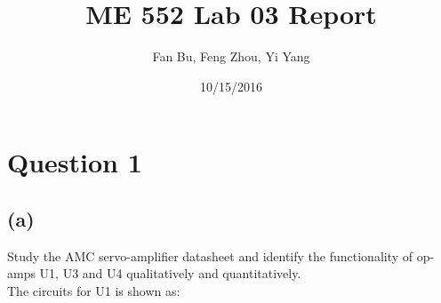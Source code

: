 \documentclass[letterpaper]{article}
\author{Fan Bu, Feng Zhou, Yi Yang}
\title{ME 552 Lab 03 Report}
\begin{document}
\date{10/15/2016}
\maketitle

\newcommand{\trace}{\mathrm{trace}}
\newcommand{\real}{\mathbb R}  %
\newcommand{\nat}{\mathbb N}   %
\newcommand{\cp}{\mathbb C}    %
\newcommand{\ds}{\displaystyle}
\newcommand{\mf}[2]{\frac{\ds #1}{\ds #2}}
\newcommand{\spanof}[1]{\textrm{span} \{ #1 \}}
\newcommand{\sol}[0]{\textbf{Solution: }}
\newcommand{\pf}[0]{\textbf{Proof:}}
\newcommand{\rme}[0]{\textrm{e}}
\newcommand{\Null}[1]{\textrm{Null}\{#1\}}
\parindent 0pt
\section*{Question 1}
\subsection*{(a)}
Study the AMC servo-amplifier datasheet and identify the functionality of op-amps U1, U3 and U4 qualitatively and quantitatively.\\

The circuits for U1 is shown as:
\end{document}
